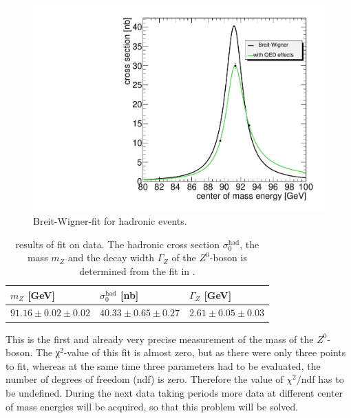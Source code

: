 \documentclass[epj,nopacs]{svjour}
\begin{document}
\begin{figure}[htb]
 \centering
 \includegraphics[width=1\columnwidth,keepaspectratio]{finalhad_fit}
 \caption{Breit-Wigner-fit for hadronic events.}
 \label{fig:fit_hadrons}
\end{figure}

\begin{table}[h]
\begin{center}
\begin{tabular}{|l|l|l|}
\hline
$m_Z$ [\si{\GeV}] & $σ_0^{\mathrm{had}}$  [\si{\nano\barn}] & $Γ_Z$ [\si{\GeV}]\\
\hline
$91.16 \pm 0.02 \pm 0.02$ & $40.33 \pm 0.65 \pm 0.27$ & $2.61 \pm 0.05 \pm 0.03$\\
\hline
\end{tabular}
\vspace*{0.3cm}
\caption{\baselineskip=0.38cm results of fit on data. The hadronic cross section $σ_0^{\mathrm{had}}$, the mass $m_Z$ and the decay width $Γ_Z$ of the $Z^0$-boson is determined from the fit in .}
\label{tab:results}
\end{center}
\vspace*{-0.5cm}
\end{table}
This is the first and already very precise measurement of the mass of the $Z^0$-boson. 
The χ$^2$-value of this fit is almost zero, but as there were only three points
to fit, whereas at the same time three parameters had to be evaluated, the
number of degrees of freedom (ndf) is zero. Therefore the value of $χ^2/$ndf has to be
undefined. During the next data taking periods more data at different center of
mass energies will be acquired, so that this problem will be solved.
\end{document}
